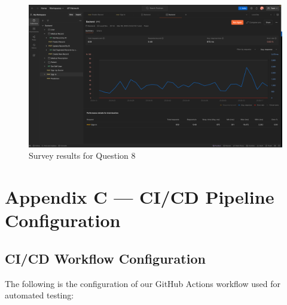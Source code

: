 \documentclass[12pt, titlepage]{article}
\begin{document}
\begin{figure}[ht!]
  \centering
  \includegraphics[scale=0.47]{../assets/Perf2.png}
  \caption{Survey results for Question 8}
  \label{fig:survey8}
\end{figure}
\clearpage
\section*{Appendix C --- CI/CD Pipeline Configuration}

\subsection*{CI/CD Workflow Configuration}

The following is the configuration of our GitHub Actions workflow used for automated testing:
\end{document}
